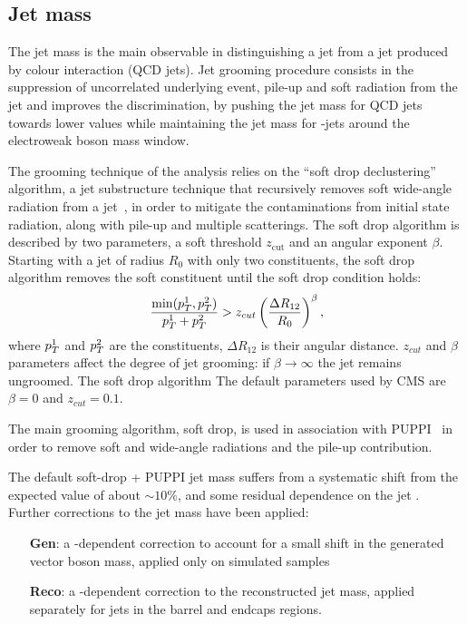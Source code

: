 \subsection{Jet mass}\label{ssec:jetmass}

The jet mass is the main observable in distinguishing a \V jet from a jet produced by colour interaction (QCD jets). Jet grooming procedure consists in the suppression of uncorrelated underlying event, pile-up and soft radiation from the jet and improves the discrimination, by pushing the jet mass for QCD jets towards lower values while maintaining the jet mass for \V-jets around the electroweak boson mass window.

\noindent The grooming technique of the analysis relies on the ``soft drop declustering'' algorithm, a jet substructure technique that recursively removes soft wide-angle radiation from a jet~\cite{Larkoski:2014wba}, in order to mitigate the contaminations from initial state radiation, along with pile-up and multiple scatterings. The soft drop algorithm is described by two parameters, a soft threshold $z_{\text{cut}}$ and an angular exponent $\beta$. Starting with a jet of radius $R_0$ with only two constituents, the soft drop algorithm removes the soft constituent until the soft drop condition holds:
\begin{equation}
\frac{\min(p_T^1,p_T^2)}{p_T^1+p_T^2} > z_{cut} \left( \frac{\Delta R_{12}}{R_0} \right)^\beta,
\end{equation}
where $p_T^1$ and $p_T^2$ are the constituents, $\Delta R_{12}$ is their angular distance. $z_{cut}$ and $\beta$ parameters affect the degree of jet grooming: if $\beta \to \infty$ the jet remains ungroomed. The soft drop algorithm %
The default parameters used by CMS are $\beta=0$ and $z_{cut}=0.1$.

The main grooming algorithm, soft drop, is used in association with PUPPI~\cite{Bertolini2014} in order to remove soft and wide-angle radiations and the pile-up contribution.

\noindent The default soft-drop + PUPPI jet mass suffers from a systematic shift from the expected value of about $\sim 10\%$, and some residual dependence on the jet \pt. Further corrections to the jet mass have been applied:

\begin{enumerate}
  \item[{\bf Gen}:] a \pt-dependent correction to account for a small shift in the generated vector boson mass, applied only on simulated samples
  \item[{\bf Reco}:] a \pt-dependent correction to the reconstructed jet mass, applied separately for jets in the barrel and endcaps regions.
\end{enumerate}

